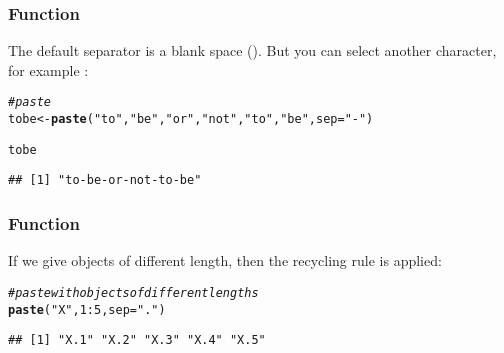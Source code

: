 \documentclass[12pt]{beamer}\usepackage[]{graphicx}\usepackage[]{color}
\makeatletter
\newcommand{\hlnum}[1]{\textcolor[rgb]{0.686,0.059,0.569}{#1}}%
\newcommand{\hlstr}[1]{\textcolor[rgb]{0.192,0.494,0.8}{#1}}%
\newcommand{\hlcom}[1]{\textcolor[rgb]{0.678,0.584,0.686}{\textit{#1}}}%
\newcommand{\hlopt}[1]{\textcolor[rgb]{0,0,0}{#1}}%
\newcommand{\hlstd}[1]{\textcolor[rgb]{0.345,0.345,0.345}{#1}}%
\newcommand{\hlkwb}[1]{\textcolor[rgb]{0.69,0.353,0.396}{#1}}%
\newcommand{\hlkwc}[1]{\textcolor[rgb]{0.333,0.667,0.333}{#1}}%
\newcommand{\hlkwd}[1]{\textcolor[rgb]{0.737,0.353,0.396}{\textbf{#1}}}%
\newenvironment{kframe}{%
 \def\at@end@of@kframe{}%
 \ifinner\ifhmode%
  \def\at@end@of@kframe{\end{minipage}}%
  \begin{minipage}{\columnwidth}%
 \fi\fi%
 \def\FrameCommand##1{\hskip\@totalleftmargin \hskip-\fboxsep
 \colorbox{shadecolor}{##1}\hskip-\fboxsep
     \hskip-\linewidth \hskip-\@totalleftmargin \hskip\columnwidth}%
 \MakeFramed {\advance\hsize-\width
   \@totalleftmargin\z@ \linewidth\hsize
   \@setminipage}}%
 {\par\unskip\endMakeFramed%
 \at@end@of@kframe}
\newenvironment{knitrout}{}{} %
\makeatother
\begin{document}
\begin{frame}[fragile]
\frametitle{Function }

The default separator is a blank space (). But you can select another character, for example :
\begin{knitrout}\footnotesize
{}\color{fgcolor}\begin{kframe}
\begin{alltt}
\hlcom{# paste}
\hlstd{tobe} \hlkwb{<-} \hlkwd{paste}\hlstd{(}\hlstr{"to"}\hlstd{,} \hlstr{"be"}\hlstd{,} \hlstr{"or"}\hlstd{,} \hlstr{"not"}\hlstd{,} \hlstr{"to"}\hlstd{,} \hlstr{"be"}\hlstd{,} \hlkwc{sep} \hlstd{=} \hlstr{"-"}\hlstd{)}

\hlstd{tobe}
\end{alltt}
\begin{verbatim}
## [1] "to-be-or-not-to-be"
\end{verbatim}
\end{kframe}
\end{knitrout}

\end{frame}


\begin{frame}[fragile]
\frametitle{Function }

If we give  objects of different length, then the recycling rule is applied:
\begin{knitrout}\footnotesize
{}\color{fgcolor}\begin{kframe}
\begin{alltt}
\hlcom{# paste with objects of different lengths}
\hlkwd{paste}\hlstd{(}\hlstr{"X"}\hlstd{,} \hlnum{1}\hlopt{:}\hlnum{5}\hlstd{,} \hlkwc{sep} \hlstd{=} \hlstr{"."}\hlstd{)}
\end{alltt}
\begin{verbatim}
## [1] "X.1" "X.2" "X.3" "X.4" "X.5"
\end{verbatim}
\end{kframe}
\end{knitrout}

\end{frame}

\end{document}
